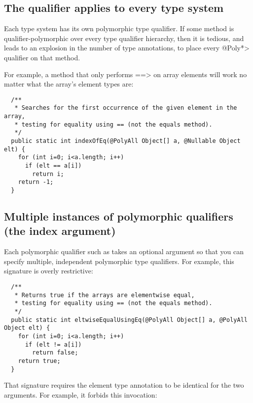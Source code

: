 \subsection{The  qualifier applies to every type system\label{polyall}}

Each type system has its own polymorphic type qualifier.
If some method is qualifier-polymorphic over every type qualifier
hierarchy, then it is tedious, and leads to an explosion in the number of
type annotations, to place every \<@Poly*> qualifier on that method.

For example, a method that only performs \<==> on array elements will work
no matter what the array's element types are:

\begin{Verbatim}
  /**
   * Searches for the first occurrence of the given element in the array,
   * testing for equality using == (not the equals method).
   */
  public static int indexOfEq(@PolyAll Object[] a, @Nullable Object elt) {
    for (int i=0; i<a.length; i++)
      if (elt == a[i])
        return i;
    return -1;
  }
\end{Verbatim}


\subsection{Multiple instances of polymorphic qualifiers (the index argument)\label{qualifier-polymorphism-multiple-instances}}


Each polymorphic qualifier such as 
takes an optional argument so that you can
specify multiple, independent polymorphic type qualifiers.  For example,
this signature is overly restrictive:

\begin{Verbatim}
  /**
   * Returns true if the arrays are elementwise equal,
   * testing for equality using == (not the equals method).
   */
  public static int eltwiseEqualUsingEq(@PolyAll Object[] a, @PolyAll Object elt) {
    for (int i=0; i<a.length; i++)
      if (elt != a[i])
        return false;
    return true;
  }
\end{Verbatim}

\noindent
That signature requires the element type annotation to be identical for the
two arguments.  For example, it forbids this invocation:

